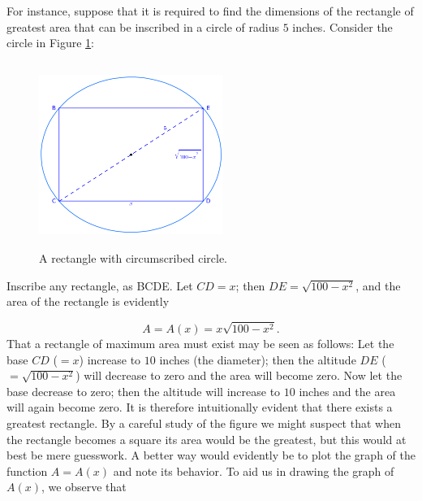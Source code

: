 \begin{example}
\label{ex:circle}
{\rm
For instance, suppose that it is required to find the dimensions 
of the rectangle of greatest area that can be inscribed 
in a circle of radius $5$ inches. Consider the circle in 
Figure \ref{fig:circle-example}:

\begin{figure}[h!]
\begin{minipage}{\textwidth}
\begin{center}
\includegraphics[height=6cm,width=6cm]{circle-example3.eps}
\end{center}
\end{minipage}
\caption{A rectangle with circumscribed circle.}
\label{fig:circle-example}
\end{figure}

\noindent
Inscribe any rectangle, as BCDE.
Let $CD = x$; then $DE = \sqrt{100 - x^2}$, and the area of the 
rectangle is evidently

\[
A = A(x) = x\sqrt{100 - x^2}.
\]
That a rectangle of maximum area must exist may be seen as follows: 
Let the base $CD$ ($= x$) increase to $10$ inches (the diameter); 
then the altitude $DE$ ($= \sqrt{100 - x^2}$) will decrease to zero 
and the area will become zero. Now let the base decrease to zero; 
then the altitude will increase to $10$ inches and the area will 
again become zero. It is therefore intuitionally evident that there 
exists a greatest rectangle. By a careful study of the figure 
we might suspect that when the rectangle becomes a square its 
area would be the greatest, but this would at best be mere 
guesswork. A better way would evidently be to plot the graph 
of the function $A=A(x)$ and note its behavior. To aid us in drawing 
the graph of $A(x)$, we observe that

}
\end{example}
